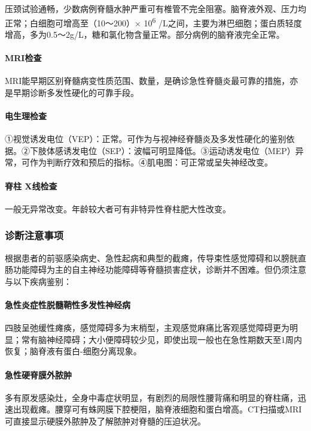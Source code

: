 压颈试验通畅，少数病例脊髓水肿严重可有椎管不完全阻塞。脑脊液外观、压力均正常；白细胞可增高至（10～200）×
10\textsuperscript{6}
/L之间，主要为淋巴细胞；蛋白质轻度增高，多为0.5～2g/L，糖和氯化物含量正常。部分病例的脑脊液完全正常。

\paragraph{MRI检查}

MRI能早期区别脊髓病变性质范围、数量，是确诊急性脊髓炎最可靠的措施，亦是早期诊断多发性硬化的可靠手段。

\paragraph{电生理检查}

①视觉诱发电位（VEP）：正常。可作为与视神经脊髓炎及多发性硬化的鉴别依据。②下肢体感诱发电位（SEP）：波幅可明显降低。③运动诱发电位（MEP）异常，可作为判断疗效和预后的指标。④肌电图：可正常或呈失神经改变。

\paragraph{脊柱 X线检查}

一般无异常改变。年龄较大者可有非特异性脊柱肥大性改变。

\subsubsection{诊断注意事项}

根据患者的前驱感染病史、急性起病和典型的截瘫，传导束性感觉障碍和以膀胱直肠功能障碍为主的自主神经功能障碍等脊髓损害症状，诊断并不困难。但仍须注意与以下疾病鉴别：

\paragraph{急性炎症性脱髓鞘性多发性神经病}

四肢呈弛缓性瘫痪，感觉障碍多为末梢型，主观感觉麻痛比客观感觉障碍更为明显；常有脑神经障碍；大小便障碍较少见，即使出现一般也在急性期数天至1周内恢复；脑脊液有蛋白-细胞分离现象。

\paragraph{急性硬脊膜外脓肿}

多有原发感染灶，全身中毒症状明显，有剧烈的局限性腰背痛和明显的脊柱痛，迅速出现截瘫。腰穿可有蛛网膜下腔梗阻，脑脊液细胞和蛋白增高。CT扫描或MRI可直接显示硬膜外脓肿及了解脓肿对脊髓的压迫状况。

